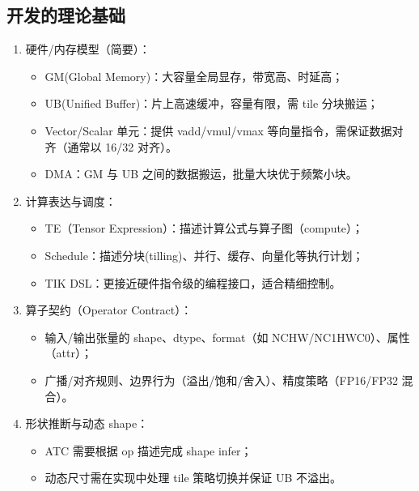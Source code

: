\subsection{开发的理论基础}\label{ux5f00ux53d1ux7684ux7406ux8bbaux57faux7840}

\begin{enumerate}
\def\labelenumi{\arabic{enumi}.}
\tightlist
\item
  硬件/内存模型（简要）：

  \begin{itemize}
  \tightlist
  \item
    GM(Global Memory)：大容量全局显存，带宽高、时延高；
  \item
    UB(Unified Buffer)：片上高速缓冲，容量有限，需 tile 分块搬运；
  \item
    Vector/Scalar 单元：提供 vadd/vmul/vmax
    等向量指令，需保证数据对齐（通常以 16/32 对齐）。
  \item
    DMA：GM 与 UB 之间的数据搬运，批量大块优于频繁小块。
  \end{itemize}
\item
  计算表达与调度：

  \begin{itemize}
  \tightlist
  \item
    TE（Tensor Expression）：描述计算公式与算子图（compute）；
  \item
    Schedule：描述分块(tilling)、并行、缓存、向量化等执行计划；
  \item
    TIK DSL：更接近硬件指令级的编程接口，适合精细控制。
  \end{itemize}
\item
  算子契约（Operator Contract）：

  \begin{itemize}
  \tightlist
  \item
    输入/输出张量的 shape、dtype、format（如
    NCHW/NC1HWC0）、属性（attr）；
  \item
    广播/对齐规则、边界行为（溢出/饱和/舍入）、精度策略（FP16/FP32
    混合）。
  \end{itemize}
\item
  形状推断与动态 shape：

  \begin{itemize}
  \tightlist
  \item
    ATC 需要根据 op 描述完成 shape infer；
  \item
    动态尺寸需在实现中处理 tile 策略切换并保证 UB 不溢出。
  \end{itemize}
\end{enumerate}

